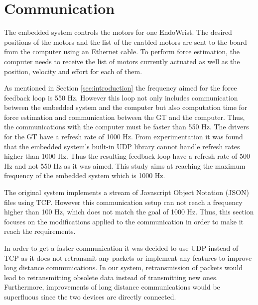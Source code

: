 \section{Communication}
The embedded system controls the motors for one EndoWrist. The desired positions of the motors and the list of the enabled motors are sent to the board from the computer using an Ethernet cable. To perform force estimation, the computer needs to receive the list of motors currently actuated as well as the position, velocity and effort for each of them.

As mentioned in Section \ref{sec:introduction} the frequency aimed for the force feedback loop is 550 Hz. However this loop not only includes communication between the embedded system and the computer but also computation time for force estimation and communication between the GT and the computer. Thus, the communications with the computer must be faster than 550 Hz.
The drivers for the GT have a refresh rate of 1000 Hz. From experimentation it was found that the embedded system's built-in UDP library cannot handle refresh rates higher than 1000 Hz. Thus the resulting feedback loop have a refresh rate of 500 Hz and not 550 Hz as it was aimed. This study aims at reaching the maximum frequency of the embedded system which is 1000 Hz.


The original system implements a stream of Javascript Object Notation (JSON)\cite{JSON_IETF} files using TCP. However this communication setup can not reach a frequency higher than 100 Hz, which does not match the goal of 1000 Hz. Thus, this section focuses on the modifications applied to the communication in order to make it reach the requirements.
 
In order to get a faster communication it was decided to use UDP instead of TCP as it does not retransmit any packets or implement any features to improve long distance communications. In our system, retransmission of packets would lead to retransmitting obsolete data instead of transmitting new ones. Furthermore, improvements of long distance communications would be superfluous since the two devices are directly connected.

